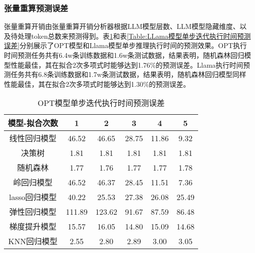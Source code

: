 \subsubsection{张量重算预测误差}

张量重算开销由张量重算开销分析器根据LLM模型层数、LLM模型隐藏维度、以及待处理token总数来预测得到。表\ref{Table:OPT模型单步迭代执行时间预测误差}和表\ref{Table:LLama模型单步迭代执行时间预测误差}分别展示了OPT模型和Llama模型单步推理执行时间的预测效果。OPT执行时间预测任务共有6.4w条训练数据和1.6w条测试数据，结果表明，随机森林回归模型性能最佳，其在拟合2次多项式时能够达到1.76\%的预测误差。Llama执行时间预测任务共有6.8条训练数据和1.7w条测试数据，结果表明，随机森林回归模型同样性能最佳，其在拟合2次多项式时能够达到1.30\%的预测误差。

\begin{table}[H]
  \centering
  \caption{OPT模型单步迭代执行时间预测误差}
  \label{Table:OPT模型单步迭代执行时间预测误差}
  \renewcommand{\arraystretch}{1.25}
  \small
  \begin{tabular}{c c c c c c}
    \toprule
    \textbf{模型-拟合次数} & \textbf{1} & \textbf{2} & \textbf{3} & \textbf{4} & \textbf{5} \\
    \midrule
    线性回归模型 & 46.52 & 46.65 & 28.75 & 11.86 & 9.32 \\ 
    决策树 & 1.81 & 1.81 & 1.81 & 1.81 & 1.81 \\ 
    随机森林 & 1.77 & 1.76 & 1.77 & 1.77 & 1.78 \\ 
    岭回归模型 & 46.52 & 46.37 & 28.45 & 11.51 & 7.36 \\ 
    lasso回归模型 & 40.22 & 25.53 & 27.38 & 26.08 & 25.49 \\ 
    弹性回归模型 & 111.89 & 123.62 & 91.67 & 87.59 & 86.48 \\ 
    梯度提升模型 & 15.57 & 16.05 & 14.80 & 15.09 & 14.68 \\ 
    KNN回归模型 & 2.55 & 2.80 & 2.89 & 3.00 & 3.05 \\ 
    \bottomrule
  \end{tabular}
\end{table}

